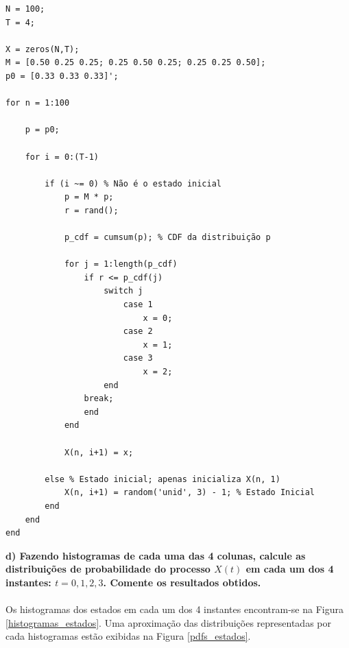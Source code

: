 \documentclass{report}
\begin{document}
\begin{lstlisting}
N = 100;
T = 4;

X = zeros(N,T);
M = [0.50 0.25 0.25; 0.25 0.50 0.25; 0.25 0.25 0.50];
p0 = [0.33 0.33 0.33]';

for n = 1:100 
    
    p = p0;

    for i = 0:(T-1)
        
        if (i ~= 0) % Não é o estado inicial
            p = M * p;
            r = rand();

            p_cdf = cumsum(p); % CDF da distribuição p

            for j = 1:length(p_cdf)
                if r <= p_cdf(j)
                    switch j
                        case 1 
                            x = 0;
                        case 2
                            x = 1;
                        case 3
                            x = 2;
                    end
                break;
                end
            end
            
            X(n, i+1) = x;
            
        else % Estado inicial; apenas inicializa X(n, 1)
            X(n, i+1) = random('unid', 3) - 1; % Estado Inicial    
        end
    end
end

\end{lstlisting}

\textbf{d) Fazendo histogramas de cada uma das 4 colunas, calcule as distribuições de probabilidade do processo $X(t)$ em cada um dos 4 instantes: $t = 0, 1, 2, 3$. Comente os resultados obtidos.}

\paragraph{} Os histogramas dos estados em cada um dos 4 instantes encontram-se na Figura \ref{histogramas_estados}. Uma aproximação das distribuições representadas por cada histogramas estão exibidas na Figura \ref{pdfs_estados}.\\
\end{document}
